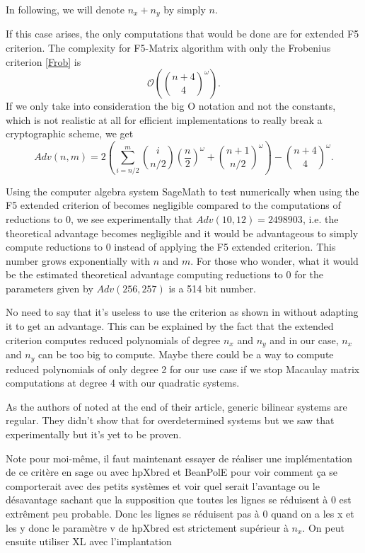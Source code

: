 \documentclass[english]{article}
\begin{document}
		 In following, we will denote $n_x + n_y$ by simply $n$.
		 
		 If this case arises, the only computations that would be done are for extended F5 criterion. The complexity for F5-Matrix algorithm with only the Frobenius criterion \ref{Frob} is 
		 $$
		 \mathcal{O}\left(\binom{n + 4}{4}^\omega\right).
		 $$
		 If we only take into consideration the big O notation and not the constants, which is not realistic at all for efficient implementations to really break a cryptographic scheme, we get
		 \begin{equation}
		 Adv(n, m) = 2\left(\sum_{i = n/2}^{m}\binom{i}{n/2}\left(\frac{n}{2}\right)^\omega + \binom{n + 1}{n/2}^\omega\right) - \binom{n + 4}{4}^\omega.
		 \label{equation_complex}
		 \end{equation}
		 
		 Using the computer algebra system SageMath \cite{sagemath} to test numerically when using the F5 extended criterion of \cite{FSS11} becomes negligible compared to the computations of reductions to 0, we see experimentally that $Adv(10, 12) = 2498903$, i.e. the theoretical advantage becomes negligible and it would be advantageous to simply compute reductions to 0 instead of applying the F5 extended criterion. This number grows exponentially with $n$ and $m$. For those who wonder, what it would be the estimated theoretical advantage computing reductions to 0 for the parameters given by \cite{HJ23} $Adv(256, 257)$ is a 514 bit number.
		 
		 No need to say that it's useless to use the criterion as shown in \cite{FSS11} without adapting it to get an advantage.
		 This can be explained by the fact that the extended criterion computes reduced polynomials of degree $n_x$ and $n_y$ and in our case, $n_x$ and $n_y$ can be too big to compute. Maybe there could be a way to compute reduced polynomials of only degree 2 for our use case if we stop Macaulay matrix computations at degree 4 with our quadratic systems.
		 
		 As the authors of \cite{FSS11} noted at the end of their article, generic bilinear systems are regular. They didn't show that for overdetermined systems but we saw that experimentally but it's yet to be proven.
		 
		 Note pour moi-même, il faut maintenant essayer de réaliser une implémentation de ce critère en sage ou avec hpXbred \cite{BS23} et BeanPolE \cite{Bou24} pour voir comment ça se comporterait avec des petits systèmes et voir quel serait l'avantage ou le désavantage sachant que la supposition que toutes les lignes se réduisent à 0 est extrêment peu probable. Donc les lignes se réduisent pas à 0 quand on a les x et les y donc le paramètre v de hpXbred est strictement supérieur à $n_x$.
		 On peut ensuite utiliser XL \cite{CKPS00} avec l'implantation \cite{NNY17}
		 
		 
\printbibliography
\end{document}
